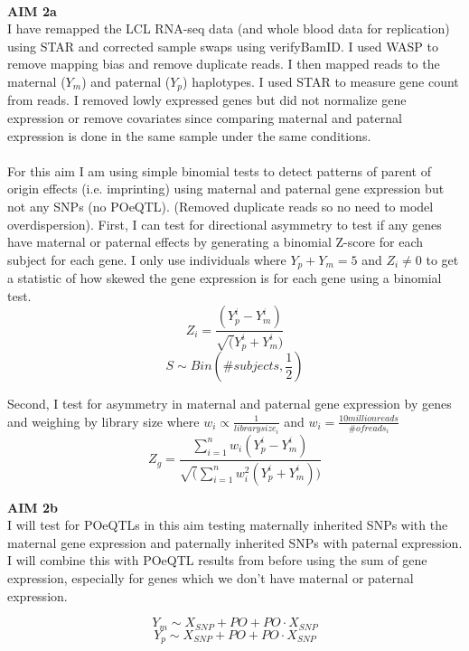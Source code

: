 \documentclass[a4paper, 11pt]{article}
\begin{document}
\textbf{\\AIM 2a}\\
I have remapped the LCL RNA-seq data (and whole blood data for replication) using STAR\cite{Dobin:2012fg} and corrected sample swaps using verifyBamID.\cite{Jun:2012je} I used WASP\cite{vandeGeijn:2015hi} to remove mapping bias and remove duplicate reads. I then mapped reads to the maternal ($Y_m$) and paternal ($Y_p$) haplotypes. I used STAR to measure gene count from reads. I removed lowly expressed genes but did not normalize gene expression or remove covariates since comparing maternal and paternal expression is done in the same sample under the same conditions. \\
\\For this aim I am using simple binomial tests to detect patterns of parent of origin effects (i.e. imprinting) using maternal and paternal gene expression but not any SNPs (no POeQTL). (Removed duplicate reads so no need to model overdispersion). 
First, I can test for directional asymmetry to test if any genes have maternal or paternal effects by generating a binomial Z-score for each subject for each gene. I only use individuals where $Y_p+Y_m=5 $ and $Z_i \neq 0 $ to get a statistic of how skewed the gene expression is for each gene using a binomial test. 
\begin{equation}\label{Zscore}
	Z_i= \frac{(Y_p^{i}-Y_m^{i})}{\sqrt(Y_p^{i}+Y_m^{i})}
\end{equation}
\begin{equation}\label{signtest}
	S \sim Bin(\# subjects, \frac{1}{2}) 
\end{equation}

Second, I test for asymmetry in maternal and paternal gene expression by genes and weighing by library size where $w_i \propto \frac{1}{library size_i} $ and $ w_i = \frac{10millionreads}{\#ofreads_i} $\\
\begin{equation}\label{my_first_eqn}
	Z_g= \frac{\sum_{i=1}^{n}w_i(Y_p^{i}-Y_m^{i})}{\sqrt(\sum_{i=1}^{n}w_i^2(Y_p^{i}+Y_m^{i}))}
\end{equation}

\begin{flushleft}
\textbf{AIM 2b}\\
I will test for POeQTLs in this aim testing maternally inherited SNPs with the maternal gene expression and paternally inherited SNPs with paternal expression. I will combine this with POeQTL results from before using the sum of gene expression, especially for genes which we don't have maternal or paternal expression.

\begin{equation}\label{poeqtl}
	Y_m \sim X_{SNP} + PO + PO\cdot X_{SNP}
\end{equation}
\begin{equation}\label{poeqtl_maternal}
	Y_p \sim X_{SNP} + PO + PO\cdot X_{SNP}
\end{equation}

\end{flushleft}
\end{document}
